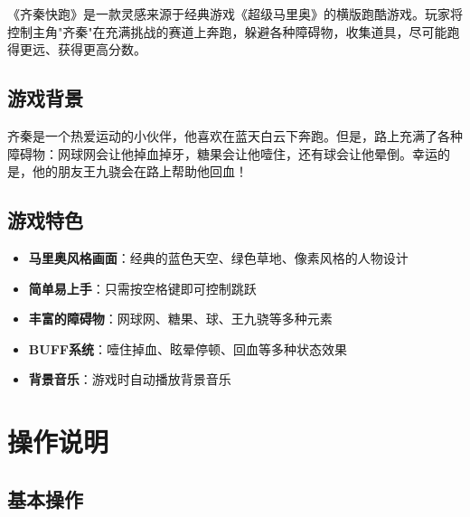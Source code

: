 \documentclass[12pt,a4paper]{article}
\begin{document}
\begin{gamebox}[游戏概述]
《齐秦快跑》是一款灵感来源于经典游戏《超级马里奥》的横版跑酷游戏。玩家将控制主角"齐秦"在充满挑战的赛道上奔跑，躲避各种障碍物，收集道具，尽可能跑得更远、获得更高分数。
\end{gamebox}

\subsection{游戏背景}

齐秦是一个热爱运动的小伙伴，他喜欢在蓝天白云下奔跑。但是，路上充满了各种障碍物：网球网会让他掉血掉牙，糖果会让他噎住，还有球会让他晕倒。幸运的是，他的朋友王九骁会在路上帮助他回血！

\subsection{游戏特色}

\begin{itemize}
  \item \textbf{马里奥风格画面}：经典的蓝色天空、绿色草地、像素风格的人物设计
  \item \textbf{简单易上手}：只需按空格键即可控制跳跃
  \item \textbf{丰富的障碍物}：网球网、糖果、球、王九骁等多种元素
  \item \textbf{BUFF系统}：噎住掉血、眩晕停顿、回血等多种状态效果
  \item \textbf{背景音乐}：游戏时自动播放背景音乐
\end{itemize}

\section{操作说明}

\subsection{基本操作}

\begin{center}
\end{center}
\end{document}
